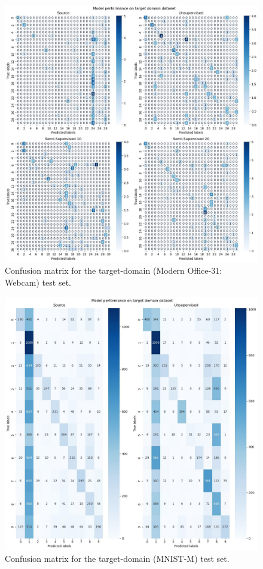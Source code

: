 \documentclass{article}
\begin{document}
	\begin{figure}
		\centering
		\includegraphics[width=12cm]{"office_cls_matrix.jpeg"}
		\caption{Confusion matrix for the target-domain (Modern Office-31: Webcam) test set.}
		\label{fig::office_confusion}
	\end{figure}
	
	\begin{figure}
		\centering
		\includegraphics[width=12cm]{"mnist_cls_matrix.jpeg"}
		\caption{Confusion matrix for the target-domain (MNIST-M) test set.}
		\label{fig::mnist_confusion}
	\end{figure}
	
\end{document}
